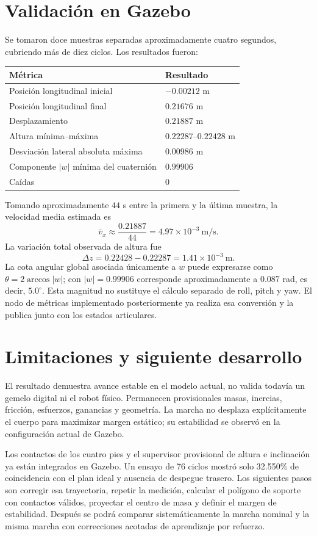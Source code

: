 \documentclass[11pt,a4paper]{article}
\begin{document}
\section{Validación en Gazebo}
Se tomaron doce muestras separadas aproximadamente cuatro segundos, cubriendo
más de diez ciclos. Los resultados fueron:
\begin{table}[h]
\centering
\begin{tabular}{ll}
\toprule
Métrica & Resultado\\
\midrule
Posición longitudinal inicial & $-0.00212$ m\\
Posición longitudinal final & $0.21676$ m\\
Desplazamiento & $0.21887$ m\\
Altura mínima--máxima & $0.22287$--$0.22428$ m\\
Desviación lateral absoluta máxima & $0.00986$ m\\
Componente $|w|$ mínima del cuaternión & $0.99906$\\
Caídas & 0\\
\bottomrule
\end{tabular}
\end{table}

Tomando aproximadamente $44$ s entre la primera y la última muestra, la
velocidad media estimada es
\[
\bar v_x\approx\frac{0.21887}{44}=4.97\times10^{-3}\ \text{m/s}.
\]
La variación total observada de altura fue
\[
\Delta z=0.22428-0.22287=1.41\times10^{-3}\ \text{m}.
\]
La cota angular global asociada únicamente a $w$ puede expresarse como
$\theta=2\arccos|w|$; con $|w|=0.99906$ corresponde aproximadamente a
$0.087$ rad, es decir, $5.0^{\circ}$. Esta magnitud no sustituye el cálculo
separado de roll, pitch y yaw. El nodo de métricas implementado posteriormente
ya realiza esa conversión y la publica junto con los estados articulares.

\section{Limitaciones y siguiente desarrollo}
El resultado demuestra avance estable en el modelo actual, no valida todavía
un gemelo digital ni el robot físico. Permanecen provisionales masas, inercias,
fricción, esfuerzos, ganancias y geometría. La marcha no desplaza explícitamente
el cuerpo para maximizar margen estático; su estabilidad se observó en la
configuración actual de Gazebo.

Los contactos de los cuatro pies y el supervisor provisional de altura e
inclinación ya están integrados en Gazebo. Un ensayo de 76 ciclos mostró solo
32.550\% de coincidencia con el plan ideal y ausencia de despegue trasero. Los
siguientes pasos son corregir esa trayectoria, repetir la medición, calcular el
polígono de soporte con contactos válidos, proyectar el centro de masa y definir
el margen de estabilidad. Después se podrá comparar sistemáticamente la
marcha nominal y la misma marcha con correcciones acotadas de aprendizaje por
refuerzo.
\end{document}
